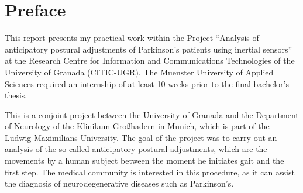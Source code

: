 \chapter*{Preface}

This report presents my practical work within the Project ``Analysis of anticipatory postural adjustments of Parkinson's patients using inertial sensors'' at the Research Centre for Information and Communications Technologies of the University of Granada (CITIC-UGR). The Muenster University of Applied Sciences required an internship of at least 10 weeks prior to the final bachelor's thesis.

This is a conjoint project between the University of Granada and the Department of Neurology of the Klinikum Großhadern in Munich, which is part of the Ludwig-Maximilians University. The goal of the project was to carry out an analysis of the so called anticipatory postural adjustments, which are the movements by a human subject between the moment he initiates gait and the first step. The medical community is interested in this procedure, as it can assist the diagnosis of neurodegenerative diseases such as Parkinson's.